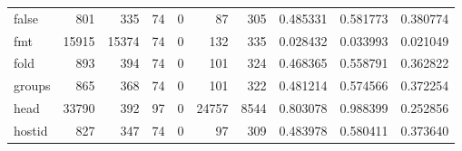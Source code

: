 \begin{tabular}{lrrrrrrrrr}
false     &                                 801 &                                             335 &                                             74 &                                             0 &                                             87 &                                          305 &                                           0.485331 &                               0.581773 &                             0.380774 \\
fmt       &                               15915 &                                           15374 &                                             74 &                                             0 &                                            132 &                                          335 &                                           0.028432 &                               0.033993 &                             0.021049 \\
fold      &                                 893 &                                             394 &                                             74 &                                             0 &                                            101 &                                          324 &                                           0.468365 &                               0.558791 &                             0.362822 \\
groups    &                                 865 &                                             368 &                                             74 &                                             0 &                                            101 &                                          322 &                                           0.481214 &                               0.574566 &                             0.372254 \\
head      &                               33790 &                                             392 &                                             97 &                                             0 &                                          24757 &                                         8544 &                                           0.803078 &                               0.988399 &                             0.252856 \\
hostid    &                                 827 &                                             347 &                                             74 &                                             0 &                                             97 &                                          309 &                                           0.483978 &                               0.580411 &                             0.373640 \\

\end{tabular}
